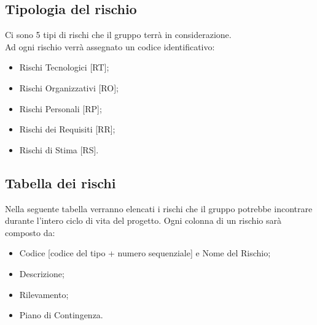 \subsection{Tipologia del rischio}
Ci sono 5 tipi di rischi che il gruppo \Gruppo{} terrà in considerazione. 
\\Ad ogni rischio verrà assegnato un codice identificativo:
\begin{itemize}
	\item Rischi Tecnologici [RT];
	\item Rischi Organizzativi [RO];
	\item Rischi Personali [RP];
	\item Rischi dei Requisiti [RR];
	\item Rischi di Stima [RS].
\end{itemize}

\subsection{Tabella dei rischi}
Nella seguente tabella verranno elencati i rischi che il gruppo \Gruppo{} potrebbe incontrare durante l'intero ciclo di vita del progetto.
Ogni colonna di un rischio sarà composto da:
\begin{itemize}
	\item Codice [codice del tipo + numero sequenziale] e Nome del Rischio;
	\item Descrizione;
	\item Rilevamento;
	\item Piano di Contingenza.
\end{itemize}


